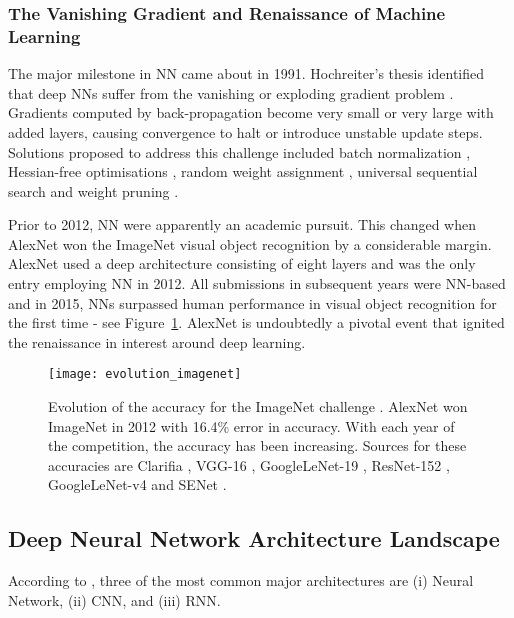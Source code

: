 \subsubsection{The Vanishing Gradient and Renaissance of Machine Learning}
The major milestone in NN came about in 1991. Hochreiter’s thesis identified that deep \acp{NN} suffer from the vanishing or exploding gradient problem \citep{Hochreiter1991}. Gradients computed by back-propagation become very small or very large with added layers, causing convergence to halt or introduce unstable update steps. Solutions proposed to address this challenge included batch normalization \citep{Ioffe2015}, Hessian-free optimisations \citep{Moller1993, Schraudolph2002, Martens2010}, random weight assignment
\citep{Hochreiter1996}, universal sequential search \citep{Levin1973} and weight pruning \citep{LeCun1990}. 

Prior to 2012, NN were apparently an academic pursuit. This changed when AlexNet \citep{Krizhevsky2012} won the ImageNet \citep{Russakovsky2015} visual object recognition by a considerable margin. AlexNet used a deep architecture consisting of eight layers \citep{Krizhevsky2015} and was the only entry employing NN in 2012. All submissions in subsequent years were NN-based \citep{Singh2015} and in 2015, \acp{NN} surpassed human performance in visual object recognition for the first time \citep{Russakovsky2015} - see Figure~\ref{fig:evolution_imagenet}. AlexNet is undoubtedly a pivotal event that ignited the renaissance in interest around deep learning.

\begin{figure}[ht!]
	\centering
	\texttt{[image: evolution\_imagenet]}
	\caption[Evolution of accuracy for the ImageNet challenge.]{Evolution of the accuracy for the ImageNet challenge \citep{Krizhevsky2012}. AlexNet won ImageNet in 2012 with 16.4\% error in accuracy. With each year of the competition, the accuracy has been increasing. Sources for these accuracies are Clarifia \citep{Zeiler2014}, VGG-16 \citep{Simonyan2014}, GoogleLeNet-19 \citep{Szegedy2014}, ResNet-152 \citep{He2016}, GoogleLeNet-v4 \citep{Szegedy2016} and SENet \citep{Hu2017}.}
	\label{fig:evolution_imagenet}
\end{figure}

\subsection{Deep Neural Network Architecture Landscape}\label{sec:dnn_arch}
According to \citet{Patterson2017}, three of the most common major architectures are (i) Neural Network, (ii) \ac{CNN}, and (iii) \ac{RNN}. 

